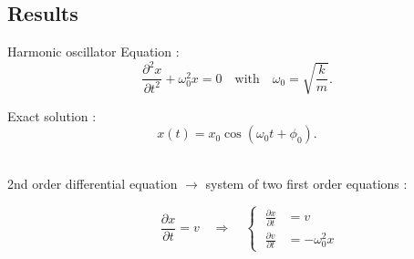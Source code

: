 \subsection{Results}

\begin{frame}[allowframebreaks]{Harmonic oscillator}
	Equation :
	\begin{equation*}
		\frac{\partial^2 x}{\partial t^2}+\omega_0^2 x = 0 \quad \text{with} \quad \omega_0=\sqrt{\frac{k}{m}}.
		\label{osc}
	\end{equation*}
	
	Exact solution :
	$$x(t) = x_0 \cos(\omega_{0}t+\phi_0).$$ 
	
	\; \\
	
	2nd order differential equation $\rightarrow$ system of two first order equations :
		
	$$\qquad \frac{\partial x}{\partial t}=v \quad \Rightarrow \quad \left\{\;\begin{aligned}
		\frac{\partial x}{\partial t}&=v \\
		\frac{\partial v}{\partial t}&=-\omega_0^2 x
	\end{aligned}\right.
	$$  
	
	\newpage
	

\end{frame}
